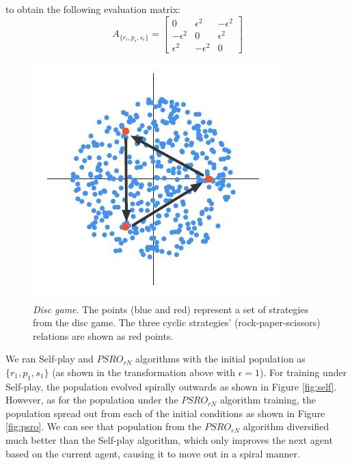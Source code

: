\documentclass{article}
\begin{document}
to obtain the following evaluation matrix:
$$
A_{\{r_\epsilon,p_\epsilon,s_\epsilon\}}= 
\begin{bmatrix} 
0 & \epsilon^2 & - \epsilon^2\\
-\epsilon^2 & 0 & \epsilon^2\\
\epsilon^2 & -\epsilon^2 &0 
\end{bmatrix}
$$

\begin{figure}[!ht]
	\centering
	\includegraphics[scale=0.6]{DiscGame.JPG}
	\caption{\textit{Disc game}. The points (blue and red) represent a set of strategies from the disc game. The three cyclic strategies' (rock-paper-scissors) relations are shown as red points.}
	\label{fig:disc}
\end{figure}


We ran Self-play and $PSRO_{rN}$ algorithms with the initial population as $\{r_1,p_1,s_1\}$ (as shown in the transformation above with $\epsilon = 1$). For training under Self-play, the population evolved spirally outwards as shown in Figure \ref{fig:self}. However, as for the population under the $PSRO_{rN}$ algorithm training, the population spread out from each of the initial conditions as shown in Figure \ref{fig:psro}. We can see that population from the $PSRO_{rN}$ algorithm diversified much better than the Self-play algorithm, which only improves the next agent based on the current agent, causing it to move out in a spiral manner.
\end{document}
